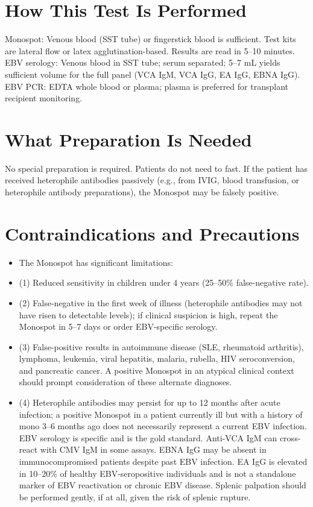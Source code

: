 \section*{How This Test Is Performed}
Monospot: Venous blood (SST tube) or fingerstick blood is sufficient. Test kits are lateral flow or latex agglutination-based. Results are read in 5--10 minutes. EBV serology: Venous blood in SST tube; serum separated; 5--7 mL yields sufficient volume for the full panel (VCA IgM, VCA IgG, EA IgG, EBNA IgG). EBV PCR: EDTA whole blood or plasma; plasma is preferred for transplant recipient monitoring.

\section*{What Preparation Is Needed}
No special preparation is required. Patients do not need to fast. If the patient has received heterophile antibodies passively (e.g., from IVIG, blood transfusion, or heterophile antibody preparations), the Monospot may be falsely positive.

\section*{Contraindications and Precautions}
\begin{itemize}
  \item The Monospot has significant limitations:
  \item (1) Reduced sensitivity in children under 4 years (25--50\% false-negative rate).
  \item (2) False-negative in the first week of illness (heterophile antibodies may not have risen to detectable levels); if clinical suspicion is high, repeat the Monospot in 5--7 days or order EBV-specific serology.
  \item (3) False-positive results in autoimmune disease (SLE, rheumatoid arthritis), lymphoma, leukemia, viral hepatitis, malaria, rubella, HIV seroconversion, and pancreatic cancer. A positive Monospot in an atypical clinical context should prompt consideration of these alternate diagnoses.
  \item (4) Heterophile antibodies may persist for up to 12 months after acute infection; a positive Monospot in a patient currently ill but with a history of mono 3--6 months ago does not necessarily represent a current EBV infection. EBV serology is specific and is the gold standard. Anti-VCA IgM can cross-react with CMV IgM in some assays. EBNA IgG may be absent in immunocompromised patients despite past EBV infection. EA IgG is elevated in 10--20\% of healthy EBV-seropositive individuals and is not a standalone marker of EBV reactivation or chronic EBV disease. Splenic palpation should be performed gently, if at all, given the risk of splenic rupture.
\end{itemize}
